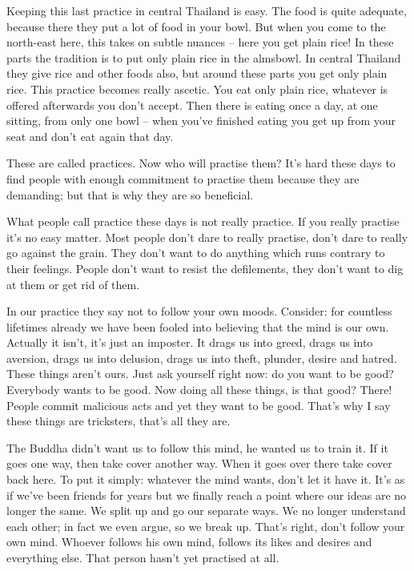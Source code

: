 Keeping this last practice in central Thailand is easy. The food is quite adequate, because there they put a lot of food in your bowl. But when you come to the north-east here, this  takes on subtle nuances -- here you get plain rice! In these parts the tradition is to put only plain rice in the almsbowl. In central Thailand they give rice and other foods also, but around these parts you get only plain rice. This  practice becomes really ascetic. You eat only plain rice, whatever is offered afterwards you don't accept. Then there is eating once a day, at one sitting, from only one bowl -- when you've finished eating you get up from your seat and don't eat again that day. 

These are called  practices. Now who will practise them? It's hard these days to find people with enough commitment to practise them because they are demanding; but that is why they are so beneficial. 

What people call practice these days is not really practice. If you really practise it's no easy matter. Most people don't dare to really practise, don't dare to really go against the grain. They don't want to do anything which runs contrary to their feelings. People don't want to resist the defilements, they don't want to dig at them or get rid of them. 

In our practice they say not to follow your own moods. Consider: for countless lifetimes already we have been fooled into believing that the mind is our own. Actually it isn't, it's just an imposter. It drags us into greed, drags us into aversion, drags us into delusion, drags us into theft, plunder, desire and hatred. These things aren't ours. Just ask yourself right now: do you want to be good? Everybody wants to be good. Now doing all these things, is that good? There! People commit malicious acts and yet they want to be good. That's why I say these things are tricksters, that's all they are. 

The Buddha didn't want us to follow this mind, he wanted us to train it. If it goes one way, then take cover another way. When it goes over there take cover back here. To put it simply: whatever the mind wants, don't let it have it. It's as if we've been friends for years but we finally reach a point where our ideas are no longer the same. We split up and go our separate ways. We no longer understand each other; in fact we even argue, so we break up. That's right, don't follow your own mind. Whoever follows his own mind, follows its likes and desires and everything else. That person hasn't yet practised at all. 

